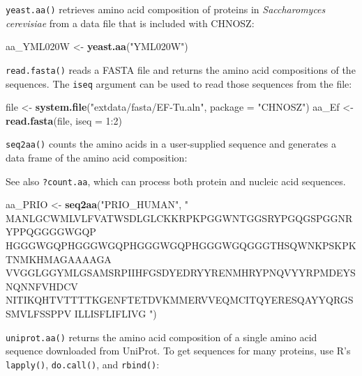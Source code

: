 \documentclass[]{tufte-handout}
\newenvironment{Shaded}{}{}
\newcommand{\KeywordTok}[1]{\textcolor[rgb]{0.00,0.44,0.13}{\textbf{#1}}}
\newcommand{\DataTypeTok}[1]{\textcolor[rgb]{0.56,0.13,0.00}{#1}}
\newcommand{\DecValTok}[1]{\textcolor[rgb]{0.25,0.63,0.44}{#1}}
\newcommand{\StringTok}[1]{\textcolor[rgb]{0.25,0.44,0.63}{#1}}
\newcommand{\OperatorTok}[1]{\textcolor[rgb]{0.40,0.40,0.40}{#1}}
\newcommand{\NormalTok}[1]{#1}
\begin{document}
{\texttt{yeast.aa()}} retrieves amino acid composition of proteins in
\emph{Saccharomyces cerevisiae} from a data file that is included with
CHNOSZ:

\begin{Shaded}
\begin{Highlighting}[]
\NormalTok{aa_YML020W <-}\StringTok{ }\KeywordTok{yeast.aa}\NormalTok{(}\StringTok{"YML020W"}\NormalTok{)}
\end{Highlighting}
\end{Shaded}

{\texttt{read.fasta()}} reads a FASTA file and returns the amino acid
compositions of the sequences. The \texttt{iseq} argument can be used to
read those sequences from the file:

\begin{Shaded}
\begin{Highlighting}[]
\NormalTok{file <-}\StringTok{ }\KeywordTok{system.file}\NormalTok{(}\StringTok{"extdata/fasta/EF-Tu.aln"}\NormalTok{, }\DataTypeTok{package =} \StringTok{"CHNOSZ"}\NormalTok{)}
\NormalTok{aa_Ef <-}\StringTok{ }\KeywordTok{read.fasta}\NormalTok{(file, }\DataTypeTok{iseq =} \DecValTok{1}\OperatorTok{:}\DecValTok{2}\NormalTok{)}
\end{Highlighting}
\end{Shaded}

{\texttt{seq2aa()}} counts the amino acids in a user-supplied sequence
and generates a data frame of the amino acid composition:

\begin{marginfigure}
See also {\texttt{?count.aa}}, which can process both protein and
nucleic acid sequences.
\end{marginfigure}

\begin{Shaded}
\begin{Highlighting}[]
\NormalTok{aa_PRIO <-}\StringTok{ }\KeywordTok{seq2aa}\NormalTok{(}\StringTok{"PRIO_HUMAN"}\NormalTok{, }\StringTok{"}
\StringTok{MANLGCWMLVLFVATWSDLGLCKKRPKPGGWNTGGSRYPGQGSPGGNRYPPQGGGGWGQP}
\StringTok{HGGGWGQPHGGGWGQPHGGGWGQPHGGGWGQGGGTHSQWNKPSKPKTNMKHMAGAAAAGA}
\StringTok{VVGGLGGYMLGSAMSRPIIHFGSDYEDRYYRENMHRYPNQVYYRPMDEYSNQNNFVHDCV}
\StringTok{NITIKQHTVTTTTKGENFTETDVKMMERVVEQMCITQYERESQAYYQRGSSMVLFSSPPV}
\StringTok{ILLISFLIFLIVG}
\StringTok{"}\NormalTok{)}
\end{Highlighting}
\end{Shaded}

{\texttt{uniprot.aa()}} returns the amino acid composition of a single
amino acid sequence downloaded from UniProt. To get sequences for many
proteins, use R's \texttt{lapply()}, \texttt{do.call()}, and
\texttt{rbind()}:
\end{document}
